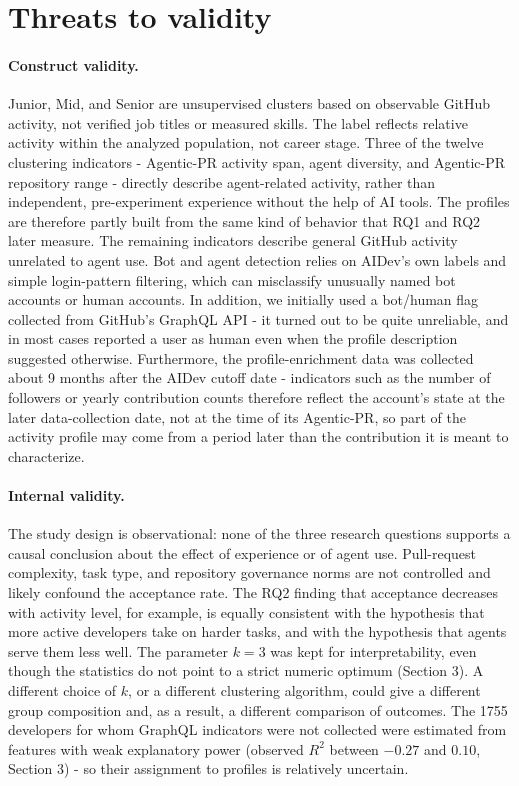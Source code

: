 \section{Threats to validity\label{sec:threats}}

\paragraph{Construct validity.}
Junior, Mid, and Senior are unsupervised clusters based on observable GitHub activity, not verified job titles or measured skills. The label reflects relative activity within the analyzed population, not career stage. Three of the twelve clustering indicators - Agentic-PR activity span, agent diversity, and Agentic-PR repository range - directly describe agent-related activity, rather than independent, pre-experiment experience without the help of AI tools. The profiles are therefore partly built from the same kind of behavior that RQ1 and RQ2 later measure. The remaining indicators describe general GitHub activity unrelated to agent use. Bot and agent detection relies on AIDev's own labels and simple login-pattern filtering, which can misclassify unusually named bot accounts or human accounts. In addition, we initially used a bot/human flag collected from GitHub's GraphQL API - it turned out to be quite unreliable, and in most cases reported a user as human even when the profile description suggested otherwise. Furthermore, the profile-enrichment data was collected about 9 months after the AIDev cutoff date - indicators such as the number of followers or yearly contribution counts therefore reflect the account's state at the later data-collection date, not at the time of its Agentic-PR, so part of the activity profile may come from a period later than the contribution it is meant to characterize.

\paragraph{Internal validity.}
The study design is observational: none of the three research questions supports a causal conclusion about the effect of experience or of agent use. Pull-request complexity, task type, and repository governance norms are not controlled and likely confound the acceptance rate. The RQ2 finding that acceptance decreases with activity level, for example, is equally consistent with the hypothesis that more active developers take on harder tasks, and with the hypothesis that agents serve them less well. The parameter $k=3$ was kept for interpretability, even though the statistics do not point to a strict numeric optimum (Section 3). A different choice of $k$, or a different clustering algorithm, could give a different group composition and, as a result, a different comparison of outcomes. The 1755 developers for whom GraphQL indicators were not collected were estimated from features with weak explanatory power (observed $R^2$ between $-0.27$ and $0.10$, Section 3) - so their assignment to profiles is relatively uncertain.

